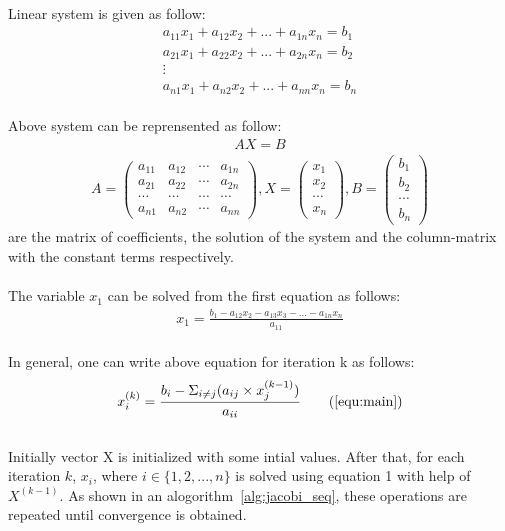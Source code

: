 \documentclass[11pt]{article}       %
\begin{document}
\noindent \\Linear system is given as follow:
\begin{align*}
a_{11}x_1+a_{12}x_2+...+a_{1n}x_n = b_1
\\a_{21}x_1+a_{22}x_2+...+a_{2n}x_n = b_2
\\ \vdots
\\a_{n1}x_1+a_{n2}x_2+...+a_{nn}x_n = b_n
\end{align*}
\\
Above system can be reprensented as follow:
\begin{align*}
AX = B
\end{align*}
\begin{align*}
A = \begin{pmatrix}
a_{11} & a_{12} & \cdots & a_{1n}\\ 
a_{21} & a_{22} & \cdots & a_{2n}\\  
\cdots & \cdots & \cdots & \cdots\\ 
a_{n1} & a_{n2} & \cdots & a_{nn}
\end{pmatrix},
X = \begin{pmatrix}
x_1\\ 
x_2\\ 
\cdots \\ 
x_n
\end{pmatrix},
B = \begin{pmatrix}
b_1\\ 
b_2\\ 
\cdots \\ 
b_n
\end{pmatrix}
\end{align*}
are the matrix of coefficients, the solution of the system and the column-matrix with the constant terms respectively.
\\
\\
The variable $x_1$ can be solved from the first equation as follows:
\begin{align*}
x_1 = \frac{b_1 - a_{12}x_2 - a_{13}x_3 - ... - a_{1n}x_n}{a_{11}}
\end{align*}
\\
In general, one can write above equation for iteration k as follows:
\begin{subequations}\label{equ:main}
\begin{align*}
x_i^{(k)} = \frac{b_i - \Sigma_{i \ne j}(a_{ij} \times x_j^{(k-1)})}{a_{ii}}
\tag{\ref{equ:main}}
\end{align*}
\end{subequations}
\\
Initially vector X is initialized with some intial values. After that, for each iteration $k$, $x_i$, where $i \in \{1,2,...,n\}$ is solved using equation 1 with help of $ X^{(k-1)}$. As shown in an alogorithm~\ref{alg:jacobi_seq}, these operations are repeated until convergence is obtained.
\end{document}
